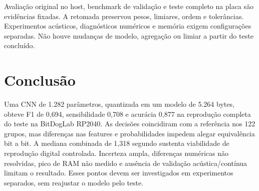 \documentclass[9pt,twocolumn,twoside,lineno]{MSBJournal}
\begin{document}
Avaliação original no host, benchmark de validação e teste completo na placa são evidências fixadas. A retomada preservou pesos, limiares, ordem e tolerâncias. Experimentos acústicos, diagnósticos numéricos e memória exigem configurações separadas. Não houve mudanças de modelo, agregação ou limiar a partir do teste concluído.

\section{Conclusão}
Uma CNN de 1.282 parâmetros, quantizada em um modelo de 5.264 bytes, obteve F1 de 0,694, sensibilidade 0,708 e acurácia 0,877 na reprodução completa do teste na BitDogLab RP2040. As decisões coincidiram com a referência nos 122 grupos, mas diferenças nas features e probabilidades impedem alegar equivalência bit a bit. A mediana combinada de 1,318 segundo sustenta viabilidade de reprodução digital controlada. Incerteza ampla, diferenças numéricas não resolvidas, pico de RAM não medido e ausência de validação acústica/contínua limitam o resultado. Esses pontos devem ser investigados em experimentos separados, sem reajustar o modelo pelo teste.


\end{document}
